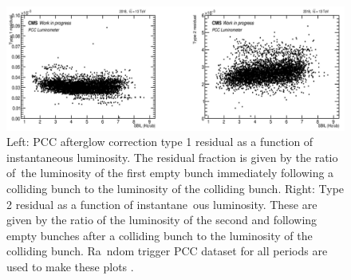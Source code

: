 \begin{itemize}




\begin{figure}[h]
  \centering
  \includegraphics[width=1\textwidth]{ashish_thesis/type1res_gr0p5_1.png}
  \caption[PCC Afterglow Residuals]{Left: PCC afterglow correction type 1 residual as a function of instantaneous luminosity. The residual fraction is given by the ratio of\
 the luminosity of the first empty bunch immediately following a colliding bunch to the luminosity of the colliding bunch. Right: Type 2 residual as a function of instantane\
ous luminosity. These are given by the ratio of the luminosity of the second and following empty bunches after a colliding bunch to the luminosity of the colliding bunch. Ra\
ndom trigger PCC dataset for all periods are used to make these plots \cite{Sehrawat2023}.}
  \label{fig:stabprof}
\end{figure}




\end{itemize}
